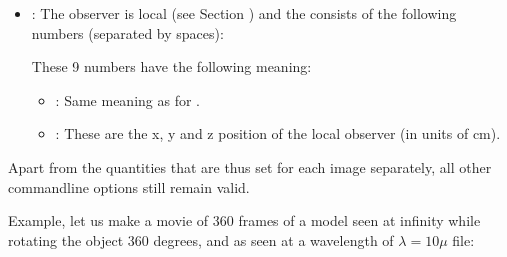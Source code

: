 \documentclass[letterpaper,10pt,english]{sphinxmanual}
\begin{document}
\begin{itemize}
\item {} 
:
The observer is local (see Section
{\hyperref[\detokenize{imagesspectra:sec-local-observer}]{}}) and the  consists of the following numbers (separated by spaces):

\begin{sphinxVerbatim}[commandchars=\\\{\}]
        
\end{sphinxVerbatim}

These 9 numbers have the following meaning:
\begin{itemize}
\item {} 
:
Same meaning as for .

\item {} 
:
These are the x, y and z position of the local observer (in units of cm).

\end{itemize}

\end{itemize}

Apart from the quantities that are thus set for each image separately, all other
command\sphinxhyphen{}line options still remain valid.

Example, let us make a movie of 360 frames of a model seen at infinity while
rotating the object 360 degrees, and as seen at a wavelength of
\(\lambda=10\mu\) file:

\begin{sphinxVerbatim}[commandchars=\\\{\}]
        
        
        
        
        
        
\end{sphinxVerbatim}
\end{document}
